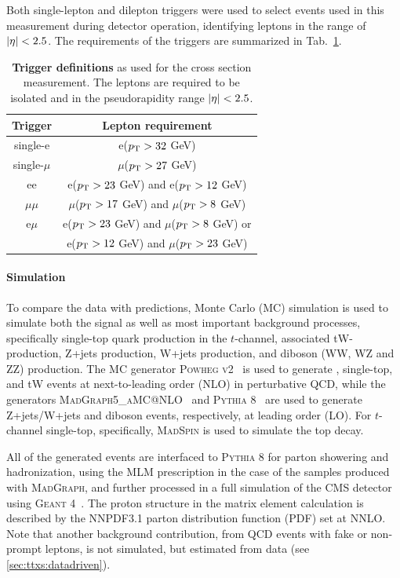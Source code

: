 
Both single-lepton and dilepton triggers were used to select events used in this measurement during detector operation, identifying leptons in the range of $|\eta| < 2.5$. The \pt requirements of the triggers are summarized in Tab.~\ref{tab:ttxs:triggers}.

\begin{table}
    \centering
    \begin{tabular}{c|c}
        Trigger & Lepton requirement \\
        \hline
        \hline
        single-e & e($p_{\mathrm{T}} > 32$ GeV) \\
        single-$\mu$ & $\mu$($p_{\mathrm{T}} > 27$ GeV) \\
        ee & e($p_{\mathrm{T}} > 23$ GeV) and e($p_{\mathrm{T}} > 12$ GeV) \\
        $\mu\mu$ & $\mu$($p_{\mathrm{T}} > 17$ GeV) and $\mu$($p_{\mathrm{T}} > 8$ GeV) \\
        e$\mu$ & e($p_{\mathrm{T}} > 23$ GeV) and $\mu$($p_{\mathrm{T}} > 8$ GeV)  or \\
        & e($p_{\mathrm{T}} > 12$ GeV) and $\mu$($p_{\mathrm{T}} > 23$ GeV)
    \end{tabular}
    \caption{\textbf{Trigger definitions} as used for the \ttbar cross section measurement. The leptons are required to be isolated and in the pseudorapidity range  $|\eta| < 2.5$.}
    \label{tab:ttxs:triggers}
\end{table}

\paragraph{Simulation}
To compare the data with predictions, Monte Carlo (MC) simulation is used to simulate both the \ttbar signal as well as most important background processes, specifically single-top quark production in the $t$-channel, associated tW-production, Z+jets production, W+jets production, and diboson (WW, WZ and ZZ) production. The MC generator \textsc{Powheg v2}~\cite{Powheg:2004, Powheg:2007, Powheg:2010} is used to generate \ttbar, single-top, and tW events at next-to-leading order (NLO) in perturbative QCD, while the generators \textsc{MadGraph5\_aMC@NLO}~\cite{MG5aMCatNLO:2014} and \textsc{Pythia 8}~\cite{Pythia:2015} are used to generate Z+jets/W+jets and diboson events, respectively, at leading order (LO). For $t$-channel single-top, specifically, \textsc{MadSpin} is used to simulate the top decay.

All of the generated events are interfaced to \textsc{Pythia 8} for parton showering and hadronization, using the MLM prescription in the case of the samples produced with \textsc{MadGraph}, and further processed in a full simulation of the CMS detector using \textsc{Geant 4}~\cite{GEANT4:2002}. The proton structure in the matrix element calculation is described by the NNPDF3.1 parton distribution function (PDF) set at NNLO. Note that another background contribution, from QCD events with fake or non-prompt leptons, is not simulated, but estimated from data (see \cref{sec:ttxs:datadriven}).


